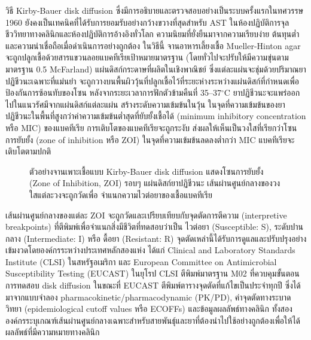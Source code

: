 วิธี Kirby-Bauer disk diffusion ซึ่งมีการอธิบายและตรวจสอบอย่างเป็นระบบครั้งแรกในทศวรรษ 1960 ยังคงเป็นเทคนิคที่ได้รับการยอมรับอย่างกว้างขวางที่สุดสำหรับ AST ในห้องปฏิบัติการจุลชีววิทยาทางคลินิกและห้องปฏิบัติการอ้างอิงทั่วโลก \cite{asm2009kirby,clsi2025} ความนิยมที่ยั่งยืนมาจากความเรียบง่าย ต้นทุนต่ำ และความน่าเชื่อถือเมื่อดำเนินการอย่างถูกต้อง ในวิธีนี้ จานอาหารเลี้ยงเชื้อ Mueller-Hinton agar จะถูกปลูกเชื้อด้วยสารแขวนลอยแบคทีเรียเป้าหมายมาตรฐาน (โดยทั่วไปจะปรับให้มีความขุ่นตามมาตรฐาน 0.5 McFarland) แผ่นดิสก์กระดาษที่ผลิตในเชิงพาณิชย์ ซึ่งแต่ละแผ่นจะชุ่มด้วยปริมาณยาปฏิชีวนะเฉพาะที่แม่นยำ จะถูกวางบนพื้นผิววุ้นที่ปลูกเชื้อไว้ที่ระยะห่างระหว่างแผ่นดิสก์ที่กำหนดเพื่อป้องกันการซ้อนทับของโซน หลังจากระยะเวลาการฟักตัวข้ามคืนที่ 35--37$^\circ$C ยาปฏิชีวนะจะแพร่ออกไปในแนวรัศมีจากแผ่นดิสก์แต่ละแผ่น สร้างระดับความเข้มข้นในวุ้น ในจุดที่ความเข้มข้นของยาปฏิชีวนะในพื้นที่สูงกว่าค่าความเข้มข้นต่ำสุดที่ยับยั้งเชื้อได้ (minimum inhibitory concentration หรือ MIC) ของแบคทีเรีย การเติบโตของแบคทีเรียจะถูกระงับ ส่งผลให้เห็นเป็นวงใสที่เรียกว่าโซนการยับยั้ง (zone of inhibition หรือ ZOI) ในจุดที่ความเข้มข้นลดลงต่ำกว่า MIC แบคทีเรียจะเติบโตตามปกติ

\begin{figure}[H]
  \centering
  \caption{ตัวอย่างจานเพาะเชื้อแบบ Kirby-Bauer disk diffusion แสดงโซนการยับยั้ง (Zone of Inhibition, ZOI)
    รอบๆ แผ่นดิสก์ยาปฏิชีวนะ เส้นผ่านศูนย์กลางของวงใสแต่ละวงจะถูกวัดเพื่อ
    จำแนกความไวต่อยาของเชื้อแบคทีเรีย \cite{asm2009kirby}}
  \label{fig:kirby_bauer}
\end{figure}

เส้นผ่านศูนย์กลางของแต่ละ ZOI จะถูกวัดและเปรียบเทียบกับจุดตัดการตีความ (interpretive breakpoints) ที่ตีพิมพ์เพื่อจำแนกสิ่งมีชีวิตที่ทดสอบว่าเป็น ไวต่อยา (Susceptible: S), ระดับปานกลาง (Intermediate: I) หรือ ดื้อยา (Resistant: R) จุดตัดเหล่านี้ได้รับการดูแลและปรับปรุงอย่างเข้มงวดโดยองค์กรระหว่างประเทศหลักสองแห่ง ได้แก่ Clinical and Laboratory Standards Institute (CLSI) ในสหรัฐอเมริกา และ European Committee on Antimicrobial Susceptibility Testing (EUCAST) ในยุโรป \cite{eucast2023} CLSI ตีพิมพ์มาตรฐาน M02 ที่ควบคุมขั้นตอนการทดสอบ disk diffusion ในขณะที่ EUCAST ตีพิมพ์ตารางจุดตัดที่แก้ไขเป็นประจำทุกปี ซึ่งได้มาจากแบบจำลอง pharmacokinetic/pharmacodynamic (PK/PD), ค่าจุดตัดทางระบาดวิทยา (epidemiological cutoff values หรือ ECOFFs) และข้อมูลผลลัพธ์ทางคลินิก \cite{giske2022} ทั้งสององค์กรระบุเกณฑ์เส้นผ่านศูนย์กลางเฉพาะสำหรับสายพันธุ์และยาที่ต้องนำไปใช้อย่างถูกต้องเพื่อให้ได้ผลลัพธ์ที่มีความหมายทางคลินิก

